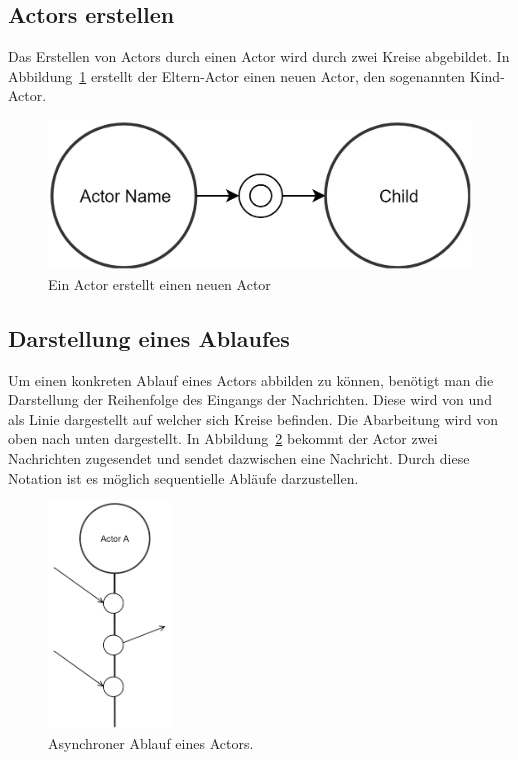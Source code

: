 \subsection{Actors erstellen}
Das Erstellen von Actors durch einen Actor wird durch zwei Kreise abgebildet. In Abbildung~\ref{fig:actor:diagram:childActorCreation} erstellt der Eltern-Actor einen neuen Actor, den sogenannten Kind-Actor.
\begin{figure}
  \centering
  \includegraphics[width=.7\linewidth]{gfx/actor/childActorCreation}
  \caption{Ein Actor erstellt einen neuen Actor}
  \label{fig:actor:diagram:childActorCreation}
\end{figure}

\subsection{Darstellung eines Ablaufes}
Um einen konkreten Ablauf eines Actors abbilden zu können, benötigt man die Darstellung der  Reihenfolge des Eingangs der Nachrichten. Diese wird von \cite{kuhn2017reactive} und \cite{Vernon2015ReactiveAkka} als Linie dargestellt auf welcher sich Kreise befinden. Die Abarbeitung wird von oben nach unten dargestellt. In Abbildung~\ref{fig:actor:diagram:asynchronMessageReceivment} bekommt der Actor zwei Nachrichten zugesendet und sendet dazwischen eine Nachricht. Durch diese Notation ist es möglich sequentielle Abläufe darzustellen.
\begin{figure}
  \centering
  \includegraphics[height=6cm]{gfx/actor/actorAsynchMessgeFlow}
  \caption{Asynchroner Ablauf eines Actors.}
  \label{fig:actor:diagram:asynchronMessageReceivment}
\end{figure}